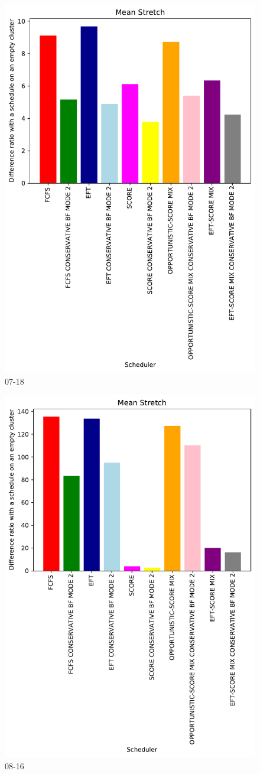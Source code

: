 \documentclass[a4paper]{article}
\begin{document}
\begin{figure}\includegraphics[width=0.9\linewidth]{MBSS/plot/Results_FCFS_Score_Backfill_2022-07-18->2022-07-18_V10000_Mean_Stretch_450_128_32_256_4_1024.pdf}\caption{07-18}\end{figure}
\begin{figure}\includegraphics[width=0.9\linewidth]{MBSS/plot/Results_FCFS_Score_Backfill_2022-08-16->2022-08-16_V10000_Mean_Stretch_450_128_32_256_4_1024.pdf}\caption{08-16}\end{figure}
\end{document}
